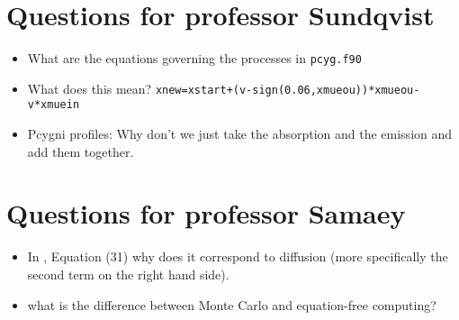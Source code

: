 \documentclass[../main/main.tex]{subfiles}
\begin{document}
\section{Questions for professor Sundqvist}
\begin{itemize}
\item What are the equations governing the processes in \texttt{pcyg.f90} 

\item What does this mean? \texttt{xnew=xstart+(v-sign(0.06,xmueou))*xmueou-v*xmuein}

\item Pcygni profiles: Why don't we just take the absorption and the emission and add them together.

\end{itemize}

\section{Questions for professor Samaey}
\begin{itemize}
\item In \cite{Dimarco2018}, Equation (31) why does it correspond to diffusion (more specifically the second term on the right hand side).
\item what is the difference between Monte Carlo and equation-free computing?
\end{itemize}

\newpage
\end{document}
